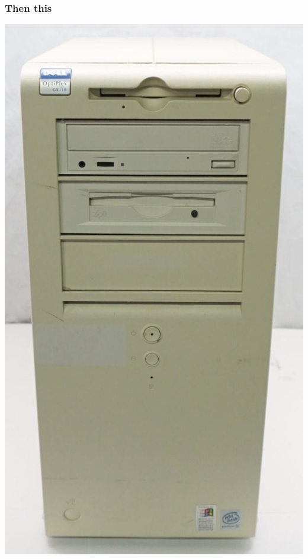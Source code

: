 \documentclass[rgb,dvipsnames]{beamer}
\begin{document}
\begin{frame}
  \frametitle{Then this}
  \begin{center}
    \includegraphics[width=\textwidth]{img/dell.jpg}
  \end{center}
\end{frame}
\end{document}
